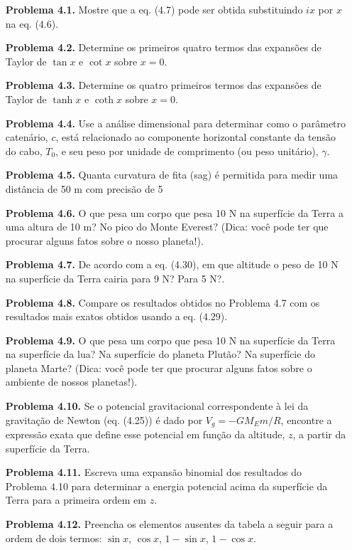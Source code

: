 \begin{enumerate}
    \item[\textbf{Problema 4.1.}] Mostre que a eq. (4.7) pode ser obtida substituindo $ix$ por $x$ na eq. (4.6).
    \item[\textbf{Problema 4.2.}] Determine os primeiros quatro termos das expansões de Taylor de $\tan x$ e $\cot x$ sobre $x = 0$.
    \item[\textbf{Problema 4.3.}] Determine os quatro primeiros termos das expansões de Taylor de $\tanh x$ e $\coth x$ sobre $x = 0$.
    \item[\textbf{Problema 4.4.}] Use a análise dimensional para determinar como o parâmetro catenário, $c$, está relacionado ao componente horizontal constante da tensão do cabo, $T_0$, e seu peso por unidade de comprimento (ou peso unitário), $\gamma$.
    \item[\textbf{Problema 4.5.}] Quanta curvatura de fita (sag) é permitida para medir uma distância de 50 m com precisão de 5%
    \item[\textbf{Problema 4.6.}] O que pesa um corpo que pesa 10 N na superfície da Terra a uma altura de 10 m? No pico do Monte Everest? (Dica: você pode ter que procurar alguns fatos sobre o nosso planeta!).
    \item[\textbf{Problema 4.7.}] De acordo com a eq. (4.30), em que altitude o peso de 10 N na superfície da Terra cairia para 9 N? Para 5 N?.
    \item[\textbf{Problema 4.8.}] Compare os resultados obtidos no Problema 4.7 com os resultados mais exatos obtidos usando a eq. (4.29).
    \item[\textbf{Problema 4.9.}] O que pesa um corpo que pesa 10 N na superfície da Terra na superfície da lua? Na superfície do planeta Plutão? Na superfície do planeta Marte? (Dica: você pode ter que procurar alguns fatos sobre o ambiente de nossos planetas!).
    \item[\textbf{Problema 4.10.}] Se o potencial gravitacional correspondente à lei da gravitação de Newton (eq. (4.25)) é dado por $V_g = -GM_Em/R$, encontre a expressão exata que define esse potencial em função da altitude, $z$, a partir da superfície da Terra.
    \item[\textbf{Problema 4.11.}] Escreva uma expansão binomial dos resultados do Problema 4.10 para determinar a energia potencial acima da superfície da Terra para a primeira ordem em $z$.
    \item[\textbf{Problema 4.12.}] Preencha os elementos ausentes da tabela a seguir para a ordem de dois termos: $\sin x$, $\cos x$, $1 - \sin x$, $1 - \cos x$.

\end{enumerate}

